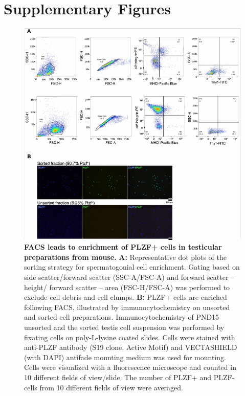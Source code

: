 \documentclass[12pt,twoside]{reedthesis}
\begin{document}
\hypertarget{supplementary-figures}{%
\section{Supplementary Figures}\label{supplementary-figures}}
\begin{subfigures}


\begin{figure}[htbp]

{\centering \includegraphics{thesis_files/figure-latex/ds1a-1} 

}

\caption[FACS leads to enrichment of PLZF+ cells in testicular preparations from mouse]{\textbf{FACS leads to enrichment of PLZF+ cells in testicular preparations from mouse.} \newline \textbf{A:} Representative dot plots of the sorting strategy for spermatogonial cell enrichment. Gating based on side scatter/forward scatter (SSC-A/FSC-A) and forward scatter – height/ forward scatter – area (FSC-H/FSC-A) was performed to exclude cell debris and cell clumps. \newline \textbf{B:} PLZF+ cells are enriched following FACS, illustrated by immunocytochemistry on unsorted and sorted cell preparations. Immunocytochemistry of PND15 unsorted and the sorted testis cell suspension was performed by fixating cells on poly-L-lysine coated slides. Cells were stained with anti-PLZF antibody (S19 clone, Active Motif) and VECTASHIELD (with DAPI) antifade mounting medium was used for mounting. Cells were visualized with a fluorescence microscope and counted in 10 different fields of view/slide. The number of PLZF+ and PLZF- cells from 10 different fields of view were averaged.}\label{fig:ds1a}
\end{figure}


\end{subfigures}
\end{document}
